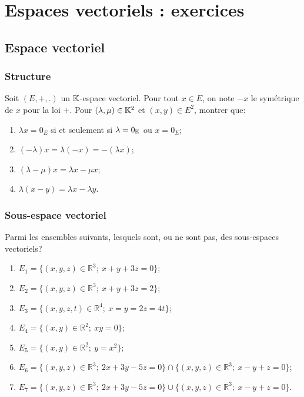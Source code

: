 \documentclass{book}
\begin{document}
\chapter*{Espaces vectoriels : exercices}



\section{Espace vectoriel}
\subsection{Structure}
\begin{Exercice}
Soit $(E,+,.)$ un $\mathbb{K}     $-espace vectoriel.
Pour tout $x\in E$, on note $-x$ le symétrique de $x$ pour la loi $+$.
Pour $(\lambda   ,\mu    )\in \mathbb{K}     ^2$ et $(x,y)\in E^2$, montrer que:
\begin{enumerate}
\item $\lambda   x = 0_E$ si et seulement si $\lambda   = 0_{\mathbb{K}}     $ ou $x = 0_E$;
\item $(-\lambda   ) x = \lambda   (-x) = -(\lambda   x)$;
\item $(\lambda   - \mu    )x = \lambda   x - \mu    x$;
\item $\lambda   (x-y) = \lambda   x - \lambda   y$.
\end{enumerate}
\end{Exercice}
\subsection{Sous-espace vectoriel}
\begin{Exercice}
Parmi les ensembles suivants, lesquels sont, ou ne sont pas, des sous-espaces vectoriels?
\begin{enumerate}
\item $E_1=\{(x,y,z)\in\mathbb R^3;\ x+y+3z=0\}$;
\item $E_2=\{(x,y,z)\in\mathbb R^3;\ x+y+3z=2\}$;
\item $E_3=\{(x,y,z,t)\in\mathbb R^4;\ x=y=2z=4t\}$;
\item $E_4=\{(x,y)\in\mathbb R^2;\ xy=0\}$;
\item $E_5=\{(x,y)\in\mathbb R^2;\ y=x^2\}$;
\item $E_6=\{(x,y,z)\in\mathbb R^3;\ 2x+3y-5z=0\}\cap\{(x,y,z)\in\mathbb R^3;\ x-y+z=0\}$;
\item $E_7=\{(x,y,z)\in\mathbb R^3;\ 2x+3y-5z=0\}\cup\{(x,y,z)\in\mathbb R^3;\ x-y+z=0\}$.
\end{enumerate}
\end{Exercice}
\end{document}
